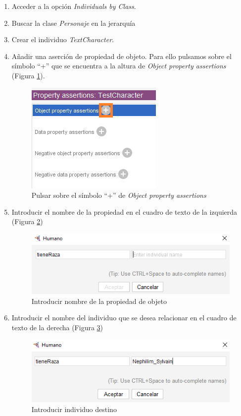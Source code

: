 \begin{enumerate}
    \item Acceder a la opción \textit{Individuals by Class}.
    \item Buscar la clase \textit{Personaje} en la jerarquía
    \item Crear el individuo \textit{TextCharacter}.
    \item Añadir una aserción de propiedad de objeto. Para ello pulsamos sobre el símbolo “+” que se encuentra a la altura de 
    \textit{Object property assertions} (Figura \ref*{AddProperties_1}).
    \begin{figure}[ht]
        \centering
        \includegraphics[scale=0.6]{Figures/Protege/AddProperties_1.png}
        \caption{Pulsar sobre el símbolo “+” de \textit{Object property assertions}}
        \label{AddProperties_1}
    \end{figure}

    \item Introducir el nombre de la propiedad en el cuadro de texto de la izquierda (Figura \ref*{AddProperties_2})
    \begin{figure}[ht]
        \centering
        \includegraphics[scale=0.6]{Figures/Protege/AddProperties_2.png}
        \caption{Introducir nombre de la propiedad de objeto}
        \label{AddProperties_2}
    \end{figure}

    \item Introducir el nombre del individuo que se desea relacionar en el cuadro de texto de la derecha (Figura \ref*{AddProperties_3})
    \begin{figure}[ht]
        \centering
        \includegraphics[scale=0.6]{Figures/Protege/AddProperties_3.png}
        \caption{Introducir individuo destino}
        \label{AddProperties_3}
    \end{figure}


\end{enumerate}
